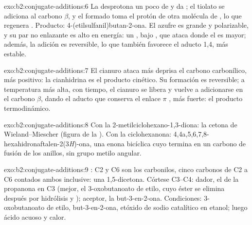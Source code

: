 \begin{solution}{exo:b2:conjugate-additions:6}
La  desprotona un poco de  y da ; el tiolato se adiciona al carbono $\beta$, y el
 formado toma el protón de otra molécula de , lo que regenera . Producto:
4-(etilsulfanil)butan-2-ona. El azufre es grande y polarizable, y su par no enlazante es alto en energía: un , bajo , que ataca donde el  es mayor; además, la adición es
reversible, lo que también favorece el aducto 1,4, más estable.
\end{solution}

\begin{solution}{exo:b2:conjugate-additions:7}
El cianuro ataca más deprisa el carbono carbonílico, más positivo: la cianhidrina es el producto cinético. Su
formación es reversible; a temperatura más alta, con tiempo, el cianuro se libera y vuelve a adicionarse en el
carbono $\beta$, dando el aducto que conserva el enlace $\pi$ , más fuerte: el producto termodinámico.
\end{solution}

\begin{solution}{exo:b2:conjugate-additions:8}
Con la 2-metilciclohexano-1,3-diona: la cetona de Wieland--Miescher (figura de la ).
Con la ciclohexanona: 4,4a,5,6,7,8-hexahidronaftalen-2(3\textit{H})-ona, una enona bicíclica cuyo
 termina en un carbono de fusión de los anillos, sin grupo metilo angular.
\end{solution}

\begin{solution}{exo:b2:conjugate-additions:9}
: C2 y C6 son los carbonilos, cinco carbonos de C2 a C6 contados ambos inclusive:
una 1,5-dicetona. Córtese C3--C4: dador, el  de la propanona en C3 (mejor, el 3-oxobutanoato de etilo, cuyo
éster se elimina después por hidrólisis y ); aceptor, la but-3-en-2-ona. Condiciones:
3-oxobutanoato de etilo, but-3-en-2-ona, etóxido de sodio catalítico en etanol; luego ácido acuoso y
calor.
\end{solution}

